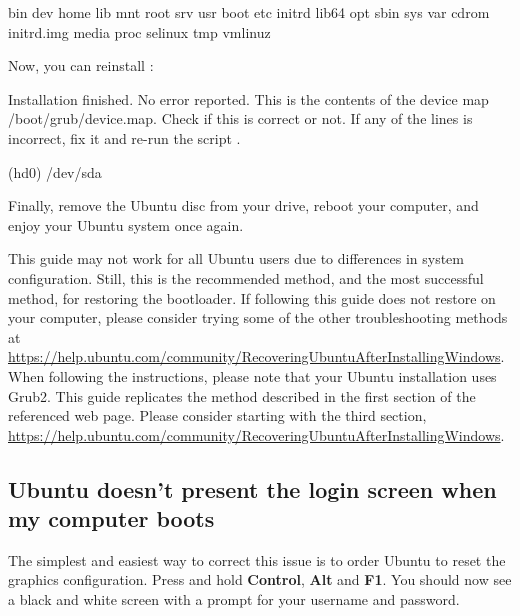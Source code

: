 \begin{terminal}
\prompt {}
bin    dev      home        lib    mnt   root     srv  usr
boot   etc      initrd      lib64  opt   sbin     sys  var
cdrom  initrd.img  media  proc  selinux  tmp  vmlinuz
\end{terminal}

Now, you can reinstall :

\begin{terminal}
\prompt {}
Installation finished. No error reported.
This is the contents of the device map /boot/grub/device.map.
Check if this is correct or not. If any of the lines is incorrect,
fix it and re-run the script .

(hd0)   /dev/sda
\end{terminal}

Finally, remove the Ubuntu disc from your  drive, reboot your computer, and enjoy your Ubuntu system once again.

This guide may not work for all Ubuntu users due to differences in system configuration. 
Still, this is the recommended method, and the most successful method, for restoring the  bootloader.
If following this guide does not restore  on your computer, please consider trying some of the other troubleshooting methods at \url{https://help.ubuntu.com/community/RecoveringUbuntuAfterInstallingWindows}.
When following the instructions, please note that your Ubuntu installation uses Grub2.
This guide replicates the method described in the first section of the referenced web page.
Please consider starting with the third section, \url{https://help.ubuntu.com/community/RecoveringUbuntuAfterInstallingWindows}.

\subsection{Ubuntu doesn't present the login screen when my computer boots}

The simplest and easiest way to correct this issue is to order Ubuntu to reset the graphics configuration.
Press and hold \textbf{Control}, \textbf{Alt} and \textbf{F1}.
You should now see a black and white screen with a prompt for your username and password.

